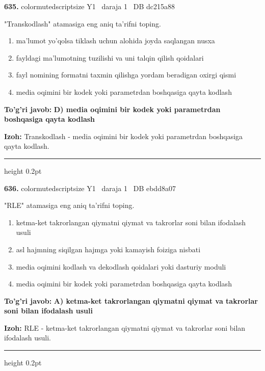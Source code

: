 \documentclass[10pt,a4paper,oneside]{article}
\begin{document}
\noindent\textbf{\color{ink}635.}  {color{muted}scriptsize Y1 \textbullet\ daraja 1 \textbullet\ DB dc215a88}
\par
"Transkodlash" atamasiga eng aniq ta'rifni toping.
\begin{enumerate}[label=\Alph*),leftmargin=9mm]
\item ma'lumot yo'qolsa tiklash uchun alohida joyda saqlangan nusxa
\item fayldagi ma'lumotning tuzilishi va uni talqin qilish qoidalari
\item fayl nomining formatni taxmin qilishga yordam beradigan oxirgi qismi
\item media oqimini bir kodek yoki parametrdan boshqasiga qayta kodlash
\end{enumerate}
\begin{tcolorbox}[enhanced,breakable,colback=teal!4,colframe=teal!50!black,boxrule=0.5pt,arc=1.1mm,left=3mm,right=3mm,top=1.7mm,bottom=1.7mm,before skip=2mm,after skip=2mm]
\textbf{\color{teal}To'g'ri javob:} \textbf{D) media oqimini bir kodek yoki parametrdan boshqasiga qayta kodlash}
\par\smallskip
\textbf{Izoh:} Transkodlash - media oqimini bir kodek yoki parametrdan boshqasiga qayta kodlash.
\end{tcolorbox}
\vspace{2mm}\hrule height 0.2pt \vspace{3mm}

\noindent\textbf{\color{ink}636.}  {color{muted}scriptsize Y1 \textbullet\ daraja 1 \textbullet\ DB ebdd8a07}
\par
"RLE" atamasiga eng aniq ta'rifni toping.
\begin{enumerate}[label=\Alph*),leftmargin=9mm]
\item ketma-ket takrorlangan qiymatni qiymat va takrorlar soni bilan ifodalash usuli
\item asl hajmning siqilgan hajmga yoki kamayish foiziga nisbati
\item media oqimini kodlash va dekodlash qoidalari yoki dasturiy moduli
\item media oqimini bir kodek yoki parametrdan boshqasiga qayta kodlash
\end{enumerate}
\begin{tcolorbox}[enhanced,breakable,colback=teal!4,colframe=teal!50!black,boxrule=0.5pt,arc=1.1mm,left=3mm,right=3mm,top=1.7mm,bottom=1.7mm,before skip=2mm,after skip=2mm]
\textbf{\color{teal}To'g'ri javob:} \textbf{A) ketma-ket takrorlangan qiymatni qiymat va takrorlar soni bilan ifodalash usuli}
\par\smallskip
\textbf{Izoh:} RLE - ketma-ket takrorlangan qiymatni qiymat va takrorlar soni bilan ifodalash usuli.
\end{tcolorbox}
\vspace{2mm}\hrule height 0.2pt \vspace{3mm}
\end{document}
